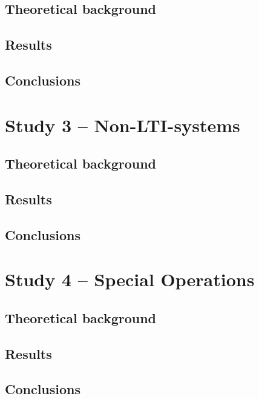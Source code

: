 \documentclass[10pt]{article}
\begin{document}
\subsection{Theoretical background}


\subsection{Results}


\subsection{Conclusions}


\clearpage


\section{Study 3 – Non-LTI-systems}


\subsection{Theoretical background}


\subsection{Results}


\subsection{Conclusions}


\clearpage


\section{Study 4 – Special Operations}


\subsection{Theoretical background}


\subsection{Results}


\subsection{Conclusions}
\end{document}
